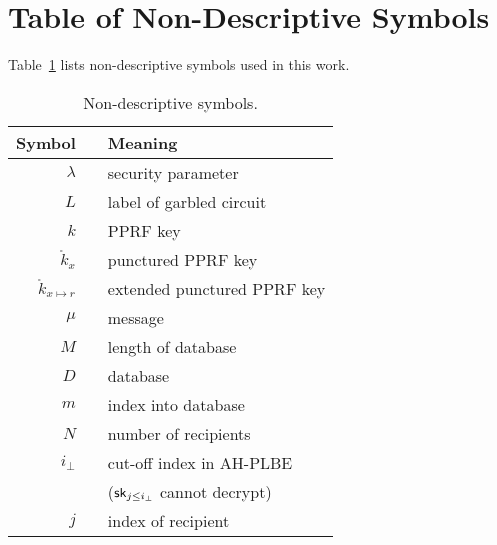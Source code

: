 \section{Table of Non-Descriptive Symbols}

Table~\ref{tab:symbols} lists non-descriptive symbols used in this work.

\begin{table}
\capstart
\centering
\caption{Non-descriptive symbols.}
\label{tab:symbols}
\begin{tabular}{rcl}
\toprule
\hspace*{0.5em}\textbf{Symbol} &\WideNarrow{}{\hspace*{0.5em}}&
\textbf{Meaning}\hspace*{0.5em} \\
\midrule
$\lambda$ && security parameter \\
$L$ && label of garbled circuit \\
$k$ && PPRF key \\
$\mathring{k}_x$ && punctured PPRF key \\
$\mathring{k}_{x\mapsto r}$ && extended punctured PPRF key \\
$\mu$ && message \\
$M$ && length of database \\
$D$ && database \\
$m$ && index into database \\
$N$ && number of recipients \\
$i_\bot$ && cut-off index in AH-PLBE \\
&& \quad ($\sk_{j\leq i_\bot}$ cannot decrypt) \\
$j$ && index of recipient \\
\bottomrule
\end{tabular}
\end{table}
